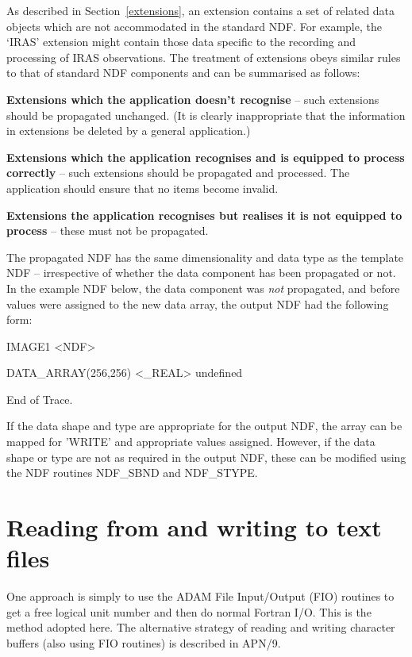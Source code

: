 \documentclass[twoside,11pt,nolof]{starlink}
\begin{document}
As described in Section~\ref{extensions}, an extension contains a set of
related data objects which are not accommodated in the standard NDF.
For example, the `IRAS' extension might contain those data specific to
the recording and processing of IRAS observations.
The treatment of extensions obeys similar rules to that of standard
NDF components and can be summarised as follows:
\begin{description}
\item \textbf{Extensions which the application doesn't recognise} -- such
extensions should be propagated unchanged.
(It is clearly inappropriate that the information in extensions
be deleted by a general application.)


\item \textbf{Extensions which the application recognises and is equipped to
process correctly} -- such extensions should be propagated and processed.
The application should ensure that no items become invalid.

\item \textbf{Extensions the application recognises but realises it is not
equipped to process} -- these must not be propagated.
\end{description}

The propagated NDF has the same dimensionality and data type as the
template NDF -- irrespective of whether the data component has been
propagated or not.
In the example NDF below, the data component was {\sl not\/} propagated,
and before values were assigned to the new data array, the
output NDF had the following form:
\begin{terminalv}
IMAGE1  <NDF>

  DATA_ARRAY(256,256)  <_REAL>   {undefined}

End of Trace.
\end{terminalv}
If the data shape and type are appropriate for the output NDF, the array
can be mapped for 'WRITE' and appropriate values assigned.
However, if the data shape or type are not as required in
the output NDF, these can be modified using the NDF routines NDF\_SBND
and NDF\_STYPE.

\newpage
\section{Reading from and writing to text files\label{rddata}}

One approach is simply to use the ADAM File Input/Output
(FIO) routines to get a free logical unit number and then do normal Fortran I/O.
This is the method adopted here. The alternative strategy of reading
and writing character buffers (also using FIO routines) is described in APN/9.
\end{document}
